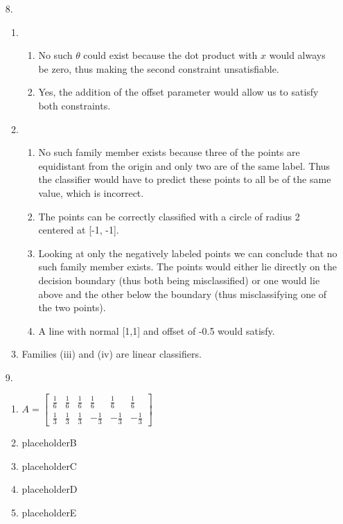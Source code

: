\documentclass{article}
\begin{document}
\begin{enumerate}
\item[8.]
	\begin{enumerate}
	\item
		\begin{enumerate}
		\item No such $\theta$ could exist because the dot product with $x$ would always be zero, thus making the second constraint unsatisfiable.
		\item Yes, the addition of the offset parameter would allow us to satisfy both constraints.
		\end{enumerate}
	\item
		\begin{enumerate}
		\item 
			  No such family member exists because three of the points are equidistant from the origin and only two are of the same label. Thus the classifier would have to predict these points to all be of the same value, which is incorrect.
		\item 
			  The points can be correctly classified with a circle of radius 2 centered at [-1, -1].
		\item 
			  Looking at only the negatively labeled points we can conclude that no such family member exists. The points would either lie directly on the decision boundary (thus both being misclassified) or one would lie above and the other below the boundary (thus misclassifying one of the two points).
		\item 
			  A line with normal [1,1] and offset of -0.5 would satisfy.
		\end{enumerate}
	\item Families (iii) and (iv) are linear classifiers.
	\end{enumerate}

\bigskip

\item[9.]
	\begin{enumerate}
	\item
		  $A = \left[ \begin{smallmatrix} 
		       \frac{1}{6} & \frac{1}{6} & \frac{1}{6} & \frac{1}{6} & \frac{1}{6} & \frac{1}{6}\\
		       \frac{1}{3} & \frac{1}{3} & \frac{1}{3} &-\frac{1}{3} &-\frac{1}{3} &-\frac{1}{3} \end{smallmatrix} \right]$
	\item placeholderB
	\item placeholderC
	\item placeholderD
	\item placeholderE
	\end{enumerate}


\end{enumerate}
\end{document}

